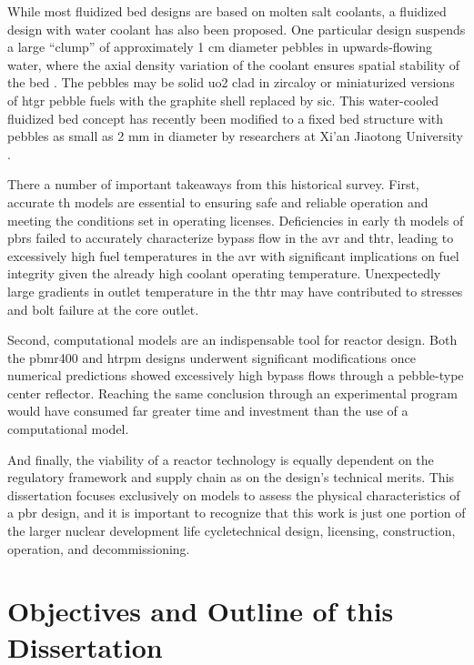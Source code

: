 While most fluidized bed designs are based on molten salt coolants, a fluidized design with water coolant has also been proposed. One particular design suspends a large ``clump'' of approximately 1 \si{\centi\meter} diameter pebbles in upwards-flowing water, where the axial density variation of the coolant ensures spatial stability of the bed \cite{sefidvash, sefidvash_1996}. The pebbles may be solid \gls{uo2} clad in zircaloy or miniaturized versions of \gls{htgr} pebble fuels with the graphite shell replaced by \gls{sic}. This water-cooled fluidized bed concept has recently been modified to a fixed bed structure with pebbles as small as 2 \si{\milli\meter} in diameter by researchers at Xi'an Jiaotong University \cite{cai,li_pbwr}.

There a number of important takeaways from this historical survey. First, accurate \gls{th} models are essential to ensuring safe and reliable operation and meeting the conditions set in operating licenses. Deficiencies in early \gls{th} models of \glspl{pbr} failed to accurately characterize bypass flow in the \gls{avr} and \gls{thtr}, leading to excessively high fuel temperatures in the \gls{avr} with significant implications on fuel integrity given the already high coolant operating temperature. Unexpectedly large gradients in outlet temperature in the \gls{thtr} may have contributed to stresses and bolt failure at the core outlet.

Second, computational models are an indispensable tool for reactor design. Both the \gls{pbmr400} and \gls{htrpm} designs underwent significant modifications once numerical predictions showed excessively high bypass flows through a pebble-type center reflector. Reaching the same conclusion through an experimental program would have consumed far greater time and investment than the use of a computational model.

And finally, the viability of a reactor technology is equally dependent on the regulatory framework and supply chain as on the design's technical merits. This dissertation focuses exclusively on models to assess the physical characteristics of a \gls{pbr} design, and it is important to recognize that this work is just one portion of the larger nuclear development life cycle\mdash technical design, licensing, construction, operation, and decommissioning. 

\section{Objectives and Outline of this Dissertation}
\label{sec:outline}

